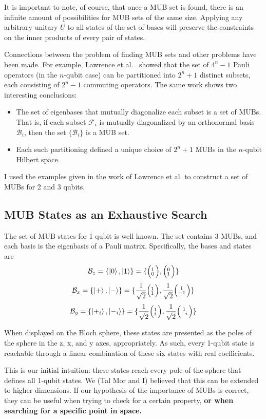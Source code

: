 \documentclass[a4paper,12pt]{article}
\newcommand{\base}{\mathcal{B}}
\newcommand{\tvect}[2]{%
  \ensuremath{\Bigl(\negthinspace\begin{smallmatrix}#1\\#2\end{smallmatrix}\Bigr)}}
\begin{document}
It is important to note, of course, that once a MUB set is found, there is an infinite amount of possibilities for MUB sets of the same size. Applying any arbitrary unitary $U$ to all states of the set of bases will preserve the constraints on the inner products of every pair of states.

Connections between the problem of finding MUB sets and other problems have been made. For example, Lawrence et al.~\cite{lawrence_mutually_2002} showed that the set of $4^n-1$ Pauli operators (in the $n$-qubit case) can be partitioned into $2^n+1$ distinct subsets, each consisting of $2^n-1$ commuting operators. The same work shows two interesting conclusions:
\begin{itemize}
    \item The set of eigenbases that mutually diagonalize each subset is a set of MUBs.
    That is, if each subset $\mathcal{F}_i$ is mutually diagonalized by an orthonormal basis $\base_i$, then the set $\{\base_i\}$ is a MUB set.
    \item Each such partitioning defined a unique choice of $2^n+1$ MUBs in the $n$-qubit Hilbert space.
\end{itemize}

I used the examples given in the work of Lawrence et al. to construct a set of MUBs for 2 and 3 qubits.

\subsection{MUB States as an Exhaustive Search}

The set of MUB states for 1 qubit is well known. The set contains 3 MUBs, and each basis is the eigenbasis of a Pauli matrix.
Specifically, the bases and states are
$$ \base_z = \{ \ket{0}, \ket{1}\}  = \{\tvect{1}{0}, \tvect{0}{1}\}$$
$$ \base_x = \{ \ket{+}, \ket{-}\}  = \{\frac{1}{\sqrt{2}}\tvect{1}{1}, \frac{1}{\sqrt{2}}\tvect{1}{-1}\}$$
$$ \base_y = \{ \ket{+_i}, \ket{-_i}\}  = \{\frac{1}{\sqrt{2}}\tvect{1}{i}, \frac{1}{\sqrt{2}}\tvect{1}{-i}\}$$

When displayed on the Bloch sphere, these states are presented as the poles of the sphere in the z, x, and y axes, appropriately. As such, every 1-qubit state is reachable through a linear combination of these six states with real coefficients.

This is our initial intuition: these states reach every pole of the sphere that defines all 1-qubit states.
We (Tal Mor and I) believed that this can be extended to higher dimensions. If our hypothesis of the importance of MUBs is correct, they can be useful when trying to check for a certain property, \textbf{or when searching for a specific point in space.}
\end{document}
